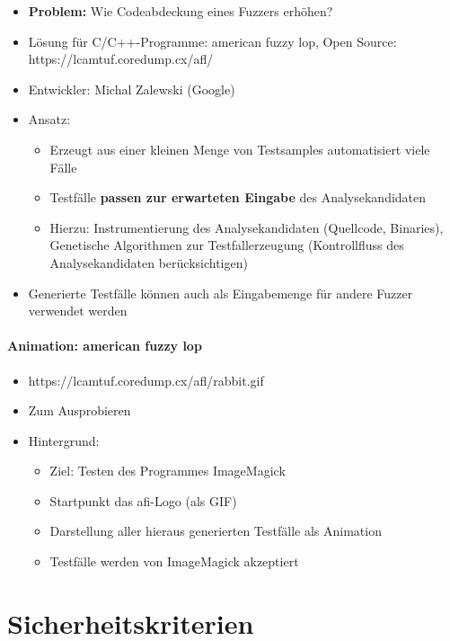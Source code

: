 \documentclass[openany]{book}
\begin{document}
\begin{itemize}
    \item \textbf{Problem:} Wie Codeabdeckung eines Fuzzers erhöhen?
    \item Lösung für C/C++-Programme: american fuzzy lop, Open Source: https://lcamtuf.coredump.cx/afl/
    \item Entwickler: Michal Zalewski (Google)
    \item Ansatz:
    \begin{itemize}
        \item Erzeugt aus einer kleinen Menge von Testsamples automatisiert viele Fälle
        \item Testfälle \textbf{passen zur erwarteten Eingabe} des Analysekandidaten
        \item Hierzu: Instrumentierung des Analysekandidaten (Quellcode, Binaries), Genetische Algorithmen zur Testfallerzeugung (Kontrollfluss des Analysekandidaten berücksichtigen) 
    \end{itemize}
    \item Generierte Testfälle können auch als Eingabemenge für andere Fuzzer verwendet werden
\end{itemize}

\subsubsection{Animation: american fuzzy lop}

\begin{itemize}
    \item https://lcamtuf.coredump.cx/afl/rabbit.gif
    \item Zum Ausprobieren
    \item Hintergrund:
    \begin{itemize}
        \item Ziel: Testen des Programmes ImageMagick
        \item Startpunkt das afi-Logo (als GIF)
        \item Darstellung aller hieraus generierten Testfälle als Animation
        \item Testfälle werden von ImageMagick akzeptiert
    \end{itemize}
\end{itemize}

\chapter{Sicherheitskriterien}
\end{document}
